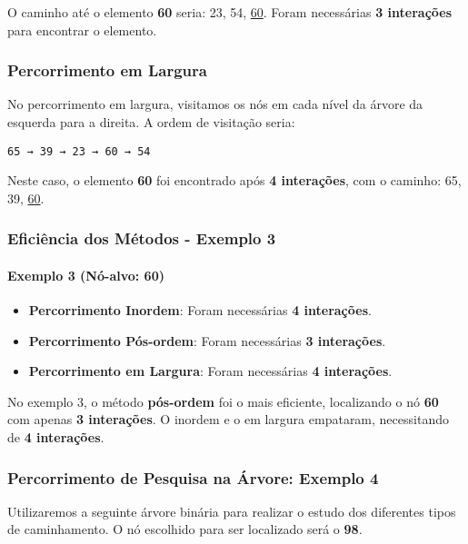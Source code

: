 \documentclass{article}
\begin{document}
\noindent
O caminho até o elemento \textbf{60} seria: 23, 54, \underline{60}. Foram necessárias \textbf{3 interações} para encontrar o elemento.

\subsubsection{Percorrimento em Largura}

No percorrimento em largura, visitamos os nós em cada nível da árvore da esquerda para a direita. A ordem de visitação seria:

\begin{verbatim}
65 → 39 → 23 → 60 → 54
\end{verbatim}

\noindent
Neste caso, o elemento \textbf{60} foi encontrado após \textbf{4 interações}, com o caminho: 65, 39, \underline{60}.

\subsubsection{Eficiência dos Métodos - Exemplo 3}

\paragraph{Exemplo 3 (Nó-alvo: 60)}

\begin{itemize}
    \item \textbf{Percorrimento Inordem}: Foram necessárias \textbf{4 interações}.
    \item \textbf{Percorrimento Pós-ordem}: Foram necessárias \textbf{3 interações}.
    \item \textbf{Percorrimento em Largura}: Foram necessárias \textbf{4 interações}.
\end{itemize}

No exemplo 3, o método \textbf{pós-ordem} foi o mais eficiente, localizando o nó \textbf{60} com apenas \textbf{3 interações}. O inordem e o em largura empataram, necessitando de \textbf{4 interações}.

\begin{center}
\subsubsection{Percorrimento de Pesquisa na Árvore: Exemplo 4}

Utilizaremos a seguinte árvore binária para realizar o estudo dos diferentes tipos de caminhamento. O nó escolhido para ser localizado será o \textbf{98}.
\end{center}
\begin{center}
\end{center}
\end{document}
